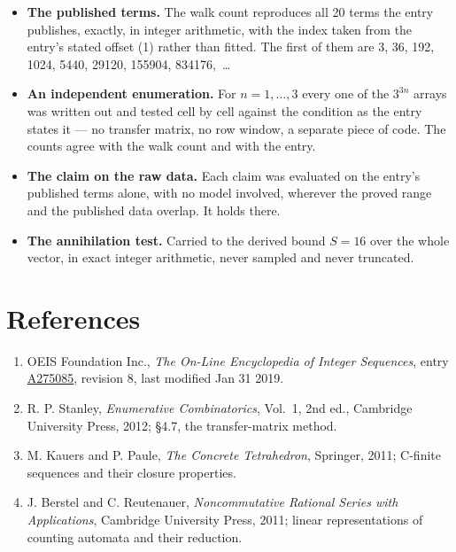 \documentclass[11pt]{article}
\theoremstyle{definition}
\begin{document}
\begin{itemize}

\item {\bfseries The published terms.} The walk count reproduces all 20 terms the entry publishes, exactly, in integer arithmetic, with the index taken from the entry's stated offset (1) rather than fitted. The first of them are 3, 36, 192, 1024, 5440, 29120, 155904, 834176,~\dots

\item {\bfseries An independent enumeration.} For $n = 1,\dots,3$ every one of the $3^{3n}$ arrays was written out and tested cell by cell against the condition as the entry states it --- no transfer matrix, no row window, a separate piece of code. The counts agree with the walk count and with the entry.

\item {\bfseries The claim on the raw data.} Each claim was evaluated on the entry's published terms alone, with no model involved, wherever the proved range and the published data overlap. It holds there.

\item {\bfseries The annihilation test.} Carried to the derived bound $S = 16$ over the whole vector, in exact integer arithmetic, never sampled and never truncated.

\end{itemize}

\section{References}

\begin{enumerate}

\item OEIS Foundation Inc., \emph{The On-Line Encyclopedia of Integer Sequences}, entry \href{https://oeis.org/A275085}{A275085}, revision 8, last modified Jan 31 2019.

\item R. P. Stanley, \emph{Enumerative Combinatorics}, Vol.~1, 2nd ed., Cambridge University Press, 2012; \S4.7, the transfer-matrix method.

\item M. Kauers and P. Paule, \emph{The Concrete Tetrahedron}, Springer, 2011; C-finite sequences and their closure properties.

\item J. Berstel and C. Reutenauer, \emph{Noncommutative Rational Series with Applications}, Cambridge University Press, 2011; linear representations of counting automata and their reduction.

\end{enumerate}
\end{document}
